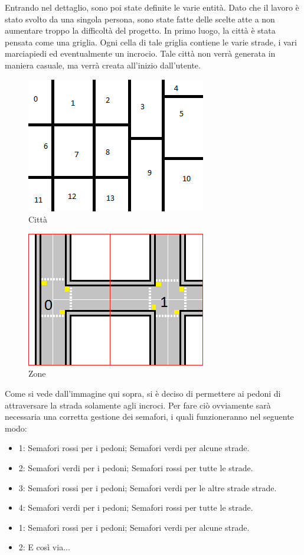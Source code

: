 \documentclass{article}
\begin{document}
Entrando nel dettaglio, sono poi state definite le varie entit\`{a}. Dato che il lavoro \`{e} stato svolto da una singola persona, sono state fatte delle scelte atte a non aumentare troppo la difficolt\`{a} del progetto. 
In primo luogo, la citt\`{a} \`{e} stata pensata come una griglia. Ogni cella di tale griglia contiene le varie strade, i vari marciapiedi ed eventualmente un incrocio. Tale citt\`{a} non verr\`{a} generata in maniera casuale, ma verr\`{a} creata all\textquoteright{}inizio dall\textquoteright{}utente. 
\begin{figure}[H]
\begin{center}
\includegraphics{./img/Citta.png}
\caption{Citt\`{a}}
\label{fig:Citt\`{a}}
\end{center}
\end{figure}
\begin{figure}[H]
\begin{center}
\includegraphics{./img/Zone.png}
\caption{Zone}
\label{fig:Zone}
\end{center}
\end{figure}
Come si vede dall\textquoteright{}immagine qui sopra, si \`{e} deciso di permettere ai pedoni di attraversare la strada solamente agli incroci. Per fare ci\`{o} ovviamente sar\`{a} necessaria una corretta gestione dei semafori, i quali funzioneranno nel seguente modo:
\begin{itemize}
\item {1:} Semafori rossi per i pedoni; Semafori verdi per alcune strade.
\item {2:} Semafori verdi per i pedoni; Semafori rossi per tutte le strade.
\item {3:} Semafori rossi per i pedoni; Semafori verdi per le altre strade strade.
\item {4:} Semafori verdi per i pedoni; Semafori rossi per tutte le strade.
\item {1:} Semafori rossi per i pedoni; Semafori verdi per alcune strade.
\item {2:} E cos\`{i} via...
\end{itemize}
\end{document}
